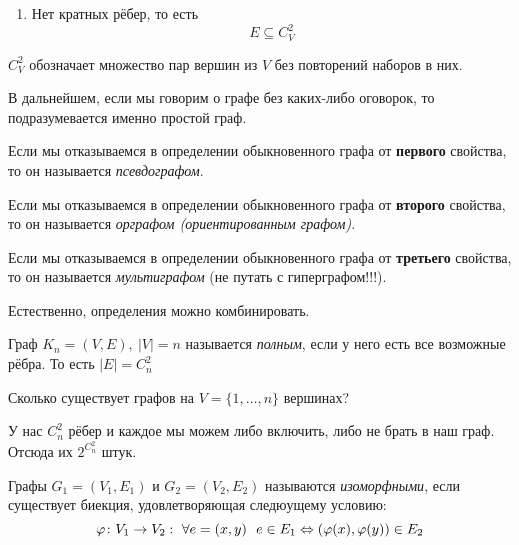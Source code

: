 \begin{multicols}{2}
\begin{definition}{}{}
\begin{enumerate}
        \item Нет кратных рёбер, то есть
        \[
          E \subseteq C_V^2
        \]
      \end{enumerate}
    \end{definition}
    
    \begin{note}{}{}
      $C_V^2$ обозначает множество пар вершин из $V$ без повторений наборов в них.
    \end{note}
    
    \begin{note}{}{}
      В дальнейшем, если мы говорим о графе без каких-либо оговорок, то подразумевается именно простой граф.
    \end{note}

    \begin{definition}{}{}
      Если мы отказываемся в определении обыкновенного графа от \textbf{первого} свойства, то он называется \textit{псевдографом}.
    \end{definition}
    
    \begin{definition}{}{}
      Если мы отказываемся в определении обыкновенного графа от \textbf{второго} свойства, то он называется \textit{орграфом (ориентированным графом)}.
    \end{definition}
    
    \begin{definition}{}{}
      Если мы отказываемся в определении обыкновенного графа от \textbf{третьего} свойства, то он называется \textit{мультиграфом} (не путать с гиперграфом!!!).
    \end{definition}
    
    \begin{note}{}{}
      Естественно, определения можно комбинировать.
    \end{note}
    
    \begin{definition}{}{}
      Граф $K_n = (V, E),\ |V| = n$ называется \textit{полным}, если у него есть все возможные рёбра. То есть $|E| = C_n^2$
    \end{definition}
    
    \Ex      Сколько существует графов на $V = \{1, \ldots, n\}$ вершинах?
      
      У нас $C_n^2$ рёбер и каждое мы можем либо включить, либо не брать в наш граф. Отсюда их $2^{C_n^2}$ штук.
    
    \begin{definition}{}{}
      Графы $G_1 = (V_1, E_1)$ и $G_2 = (V_2, E_2)$ называются \textit{изоморфными}, если существует биекция, удовлетворяющая следюущему условию:
      \[
        \varphi \colon V_1 \to V_2 :\  \forall e = (x, y)\ \ e \in E_1 \Leftrightarrow (\varphi(x), \varphi(y)) \in E_2
      \]
    \end{definition}
    

\end{multicols}
